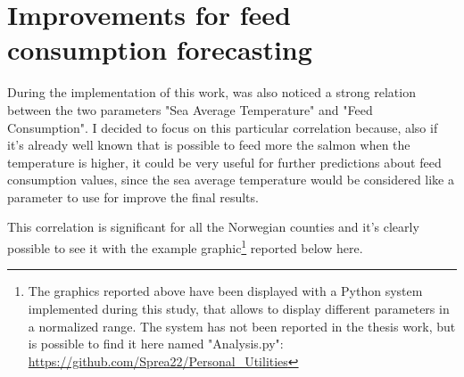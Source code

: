 \newpage

\section{Improvements for feed consumption forecasting }
During the implementation of this work, was also noticed a strong relation between the two parameters "Sea Average Temperature" and "Feed Consumption".
I decided to focus on this particular correlation because, also if it's already well known that is possible to feed more the salmon when the temperature is higher, it could be very useful for further predictions about feed consumption values, since the sea average temperature would be considered like a parameter to use for improve the final results.

This correlation is significant for all the Norwegian counties and it's clearly possible to see it with the example graphic\footnote{The graphics reported above have been displayed with a Python system implemented during this study, that allows to display different parameters in a normalized range. The system has not been reported in the thesis work, but is possible to find it here named "Analysis.py": \\ \url{https://github.com/Sprea22/Personal_Utilities}} reported below here. 

\vspace{-10mm}

